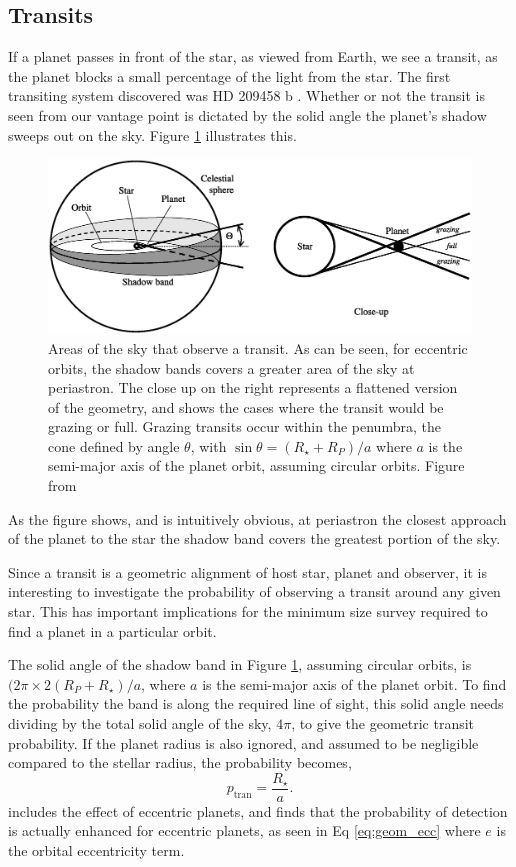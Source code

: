 \subsection{Transits}\label{sec:transits}
If a planet passes in front of the star, as viewed from Earth, we see a transit, as the planet blocks a small percentage of the light from the star. The first transiting system discovered was HD 209458 b \citep{2000Charbonneau}. Whether or not the transit is seen from our vantage point is dictated by the solid angle the planet's shadow sweeps out on the sky. Figure \ref{fig:transit_prob} illustrates this.
\begin{figure}[H]
\centering
\includegraphics[width=\columnwidth]{probcalc.eps}
\caption{Areas of the sky that observe a transit. As can be seen, for eccentric orbits, the shadow bands covers a greater area of the sky at periastron. The close up on the right represents a flattened version of the geometry, and shows the cases where the transit would be grazing or full. Grazing transits occur within the penumbra, the cone defined by angle $\theta$, with $\sin\theta = (R_{\star} + R_{P})/a$ where $a$ is the semi-major axis of the planet orbit, assuming circular orbits.  Figure from \protect\cite{Winn2010}}
\label{fig:transit_prob}
\end{figure}
As the figure shows, and is intuitively obvious, at periastron \ndash the closest approach of the planet to the star \ndash the shadow band covers the greatest portion of the sky. 

Since a transit is a geometric alignment of host star, planet and observer, it is interesting to investigate the probability of observing a transit around any given star. This has important implications for the minimum size survey required to find a planet in a particular orbit. 

The solid angle of the shadow band in Figure \ref{fig:transit_prob}, assuming circular orbits, is $(2\pi \times 2(R_{P}+R_{\star})/a$, where $a$ is the semi-major axis of the planet orbit. To find the probability the band is along the required line of sight, this solid angle needs dividing by the total solid angle of the sky, $4\pi$, to give the geometric transit probability. If the planet radius is also ignored, and assumed to be negligible compared to the stellar radius, the probability becomes,
\begin{equation}
p_{\textrm{tran}}=\frac{R_{\star}}{a}.
\label{eq:geom}
\end{equation}
\cite{2007Barnes} includes the effect of eccentric planets, and finds that the probability of detection is actually enhanced for eccentric planets, as seen in Eq \ref{eq:geom_ecc} where $e$ is the orbital eccentricity term. 

